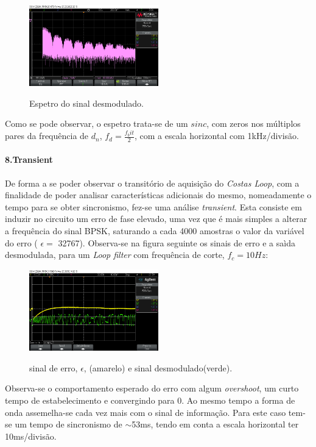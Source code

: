 \documentclass[11pt]{article}
\numberwithin{equation}{section}
\begin{document}
	\begin{figure}[H]
		\centering
		\includegraphics[width=0.5\textwidth]{./espetro}~\\
		\caption{Espetro do sinal desmodulado.}
		\label{espetro}
	\end{figure}
	
	Como se pode observar, o espetro trata-se de um $sinc$, com zeros nos múltiplos pares da frequência de $d_n$, $f_d=\frac{f_bit}{2}$, com a escala horizontal com 1kHz/divisão.
	
	\paragraph{8.Transient} \hspace{0pt} \label{para:P3-8}
	
	De forma a se poder observar o transitório de aquisição do \textit{Costas Loop}, com a finalidade de poder analisar características adicionais do mesmo, nomeadamente o tempo para se obter sincronismo, fez-se uma análise \textit{transient}. Esta consiste em induzir no circuito um erro de fase elevado, uma vez que é mais simples a alterar a frequência do sinal BPSK, saturando a cada 4000 amostras o valor da variável do erro ( $\epsilon=$ 32767). Observa-se na figura seguinte os sinais de erro e a saìda desmodulada, para um \textit{Loop filter} com frequência de corte, $f_c = 10Hz$:
	
	\begin{figure}[H]
		\centering
		\includegraphics[width=0.5\textwidth]{./transient10Hz}~\\
		\caption{sinal de erro, $\epsilon$, (amarelo) e sinal desmodulado(verde).}
		\label{trans10}
	\end{figure}
	Observa-se o comportamento esperado do erro com algum \textit{overshoot}, um curto tempo de estabelecimento e convergindo para 0. Ao mesmo tempo a forma de onda assemelha-se cada vez mais com o sinal de informação. Para este caso tem-se um tempo de sincronismo de $\sim$53ms, tendo em conta a escala horizontal ter 10ms/divisão.
	
\end{document}
